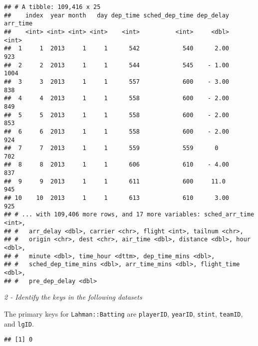 \documentclass[]{article}
\newenvironment{Shaded}{\begin{snugshade}}{\end{snugshade}}
\newcommand{\KeywordTok}[1]{\textcolor[rgb]{0.13,0.29,0.53}{\textbf{#1}}}
\newcommand{\DataTypeTok}[1]{\textcolor[rgb]{0.13,0.29,0.53}{#1}}
\newcommand{\DecValTok}[1]{\textcolor[rgb]{0.00,0.00,0.81}{#1}}
\newcommand{\StringTok}[1]{\textcolor[rgb]{0.31,0.60,0.02}{#1}}
\newcommand{\OperatorTok}[1]{\textcolor[rgb]{0.81,0.36,0.00}{\textbf{#1}}}
\newcommand{\NormalTok}[1]{#1}
\theoremstyle{definition}
\theoremstyle{definition}
\theoremstyle{definition}
\theoremstyle{remark}
\begin{document}
\begin{verbatim}
## # A tibble: 109,416 x 25
##    index  year month   day dep_time sched_dep_time dep_delay arr_time
##    <int> <int> <int> <int>    <int>          <int>     <dbl>    <int>
##  1     1  2013     1     1      542            540      2.00      923
##  2     2  2013     1     1      544            545    - 1.00     1004
##  3     3  2013     1     1      557            600    - 3.00      838
##  4     4  2013     1     1      558            600    - 2.00      849
##  5     5  2013     1     1      558            600    - 2.00      853
##  6     6  2013     1     1      558            600    - 2.00      924
##  7     7  2013     1     1      559            559      0         702
##  8     8  2013     1     1      606            610    - 4.00      837
##  9     9  2013     1     1      611            600     11.0       945
## 10    10  2013     1     1      613            610      3.00      925
## # ... with 109,406 more rows, and 17 more variables: sched_arr_time <int>,
## #   arr_delay <dbl>, carrier <chr>, flight <int>, tailnum <chr>,
## #   origin <chr>, dest <chr>, air_time <dbl>, distance <dbl>, hour <dbl>,
## #   minute <dbl>, time_hour <dttm>, dep_time_mins <dbl>,
## #   sched_dep_time_mins <dbl>, arr_time_mins <dbl>, flight_time <dbl>,
## #   pre_dep_delay <dbl>
\end{verbatim}

\emph{2 - Identify the keys in the following datasets}

The primary keys for \texttt{Lahman::Batting} are \texttt{playerID},
\texttt{yearID}, \texttt{stint}, \texttt{teamID}, and \texttt{lgID}.

\begin{Shaded}
\end{Shaded}

\begin{verbatim}
## [1] 0
\end{verbatim}
\end{document}

